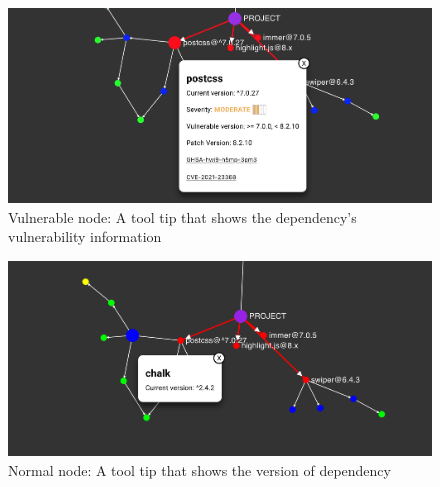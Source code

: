 \documentclass[conference]{IEEEtran}
\begin{document}
\begin{figure}
		\centering
		\includegraphics[width=\columnwidth]{Figures/tooltip_moderate}
		\caption{Vulnerable node: A tool tip that shows the dependency's vulnerability information}
		\label{fig:tooltip_moderate}
	\end{figure}

	\begin{figure}
		\centering
		\includegraphics[width=\linewidth]{Figures/tooltip_normal}
		\caption{Normal node: A tool tip that shows the version of dependency}
		\label{fig:tooltip_normal}
	\end{figure}
\end{document}
